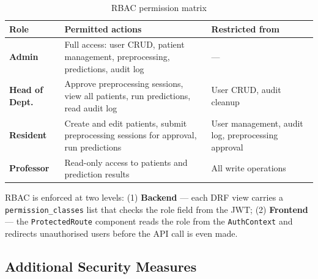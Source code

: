 \documentclass[12pt,a4paper,twoside]{report}
\begin{document}
\begin{table}[htbp]
\centering
\caption{RBAC permission matrix}\label{tab:rbac}
\begin{tabularx}{\textwidth}{lXp{3.5cm}}
\toprule
\textbf{Role} & \textbf{Permitted actions} & \textbf{Restricted from} \\
\midrule
\textbf{Admin} &
  Full access: user CRUD, patient management, preprocessing, predictions, audit log &
  — \\
\textbf{Head of Dept.} &
  Approve preprocessing sessions, view all patients, run predictions, read audit log &
  User CRUD, audit cleanup \\
\textbf{Resident} &
  Create and edit patients, submit preprocessing sessions for approval, run predictions &
  User management, audit log, preprocessing approval \\
\textbf{Professor} &
  Read-only access to patients and prediction results &
  All write operations \\
\bottomrule
\end{tabularx}
\end{table}

RBAC is enforced at two levels: (1) \textbf{Backend} — each DRF view carries a \texttt{permission\_classes} list that checks the role field from the JWT; (2) \textbf{Frontend} — the \texttt{ProtectedRoute} component reads the role from the \texttt{AuthContext} and redirects unauthorised users before the API call is even made.

\subsection{Additional Security Measures}
\end{document}
